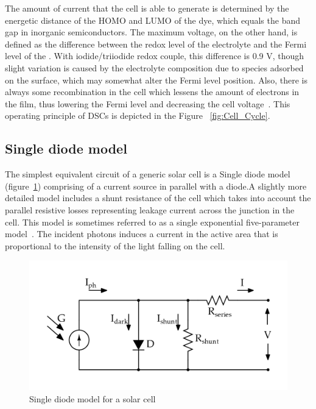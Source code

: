 The amount of current that the cell is able to generate is determined by the energetic distance of the \ac{HOMO} and \ac{LUMO} of the dye, which equals the band gap in inorganic semiconductors. The maximum voltage, on the other hand, is defined as the difference between the redox level of the electrolyte and the Fermi level of the . With iodide/triiodide redox couple, this difference is 0.9 V, though slight variation is caused by the electrolyte composition due to species adsorbed on the  surface, which may somewhat alter the Fermi level position. Also, there is always some recombination in the cell which lessens the amount of electrons in the  film, thus lowering the Fermi level and decreasing the cell voltage~\cite{toivola2010dye}. This operating principle of \ac{DSCs} is depicted in the Figure ~\ref{fig:Cell_Cycle}. \\


  
  
\subsection{Single diode model}\label{sec:SDM}
The simplest equivalent circuit of a generic solar cell is a Single diode model (figure~\ref{fig:EQu_cell}) comprising of a current source in parallel with a diode.A slightly more detailed model includes a shunt resistance of the cell which takes into account the parallel resistive losses representing leakage current across the junction in the cell. This model is sometimes referred to as a single exponential five-parameter model~\cite{vignati2012solutions}. The incident photons induces a current in the active area that is proportional to the intensity of the light falling on the cell.

 \begin{figure}[H]
  \begin{center}
  \includegraphics[width=\textwidth]{images/simplified_single_diode_model}
  \caption{ Single diode model for a solar cell }
  \label{fig:EQu_cell}
  \end{center}
  \end{figure}
  
